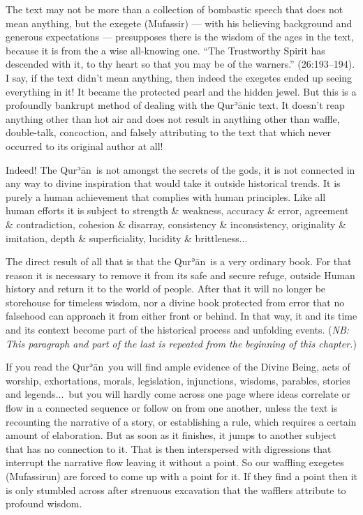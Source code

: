 \documentclass[12pt]{memoir}
\def\´{ʾ} %
\def \Quran{Qur\-\´ān} %
\def\–{-\hskip0pt}
\newcommand{\QRef}[1]{{\color{darkblue}#1}}
\newcommand{\NB}[1]{\emph{\small NB: #1}}
\begin{document}
The text may not be more than a collection of bombastic speech
that does not mean anything, but the exegete (Mufassir) —
with his believing background and generous expectations —
presupposes there is the wisdom of the ages in the text,
because it is from the a wise all\–knowing one.
“The Trustworthy Spirit has descended with it,
to thy heart so that you may be of the warners.” (\QRef{26:193–194}).
I say, if the text didn’t mean anything,
then indeed the exegetes ended up seeing everything in it!
It became the protected pearl and the hidden jewel.
But this is a profoundly bankrupt method of dealing with the \Quran{}ic text.
It doesn’t reap anything other than hot air and does not result
in anything other than waffle, double-talk, concoction,
and falsely attributing to the text that
which never occurred to its original author at all!

Indeed! The \Quran\ is not amongst the secrets of the gods,
it is not connected in any way to divine inspiration
that would take it outside historical trends.
It is purely a human achievement that complies with human principles.
Like all human efforts it is subject to strength \& weakness,
accuracy \& error, agreement \& contradiction, cohesion \& disarray,
consistency \& inconsistency, originality \& imitation,
depth \& superficiality, lucidity \& brittleness...

The direct result of all that is that the \Quran\ is a very ordinary book.
For that reason it is necessary to remove it from its safe and secure refuge,
outside Human history and return it to the world of people.
After that it will no longer be storehouse for timeless wisdom,
nor a divine book protected from error that no falsehood
can approach it from either front or behind.
In that way, it and its time and its context become
part of the historical process and unfolding events.
(\NB{This paragraph and part of the last is repeated
from the beginning of this chapter.})

If you read the \Quran\ you will find ample evidence of the Divine Being,
acts of worship, exhortations, morals, legislation, injunctions, wisdoms,
parables, stories and legends...\ but you will hardly come across one page
where ideas correlate or flow in a connected sequence
or follow on from one another,
unless the text is recounting the narrative of a story,
or establishing a rule, which requires a certain amount of elaboration.
But as soon as it finishes, it jumps to another subject
that has no connection to it.
That is then interspersed with digressions that
interrupt the narrative flow leaving it without a point.
So our waffling exegetes (Mufassirun) are forced
to come up with a point for it.
If they find a point then it is only stumbled across after
strenuous excavation that the wafflers attribute to profound wisdom.
\end{document}
